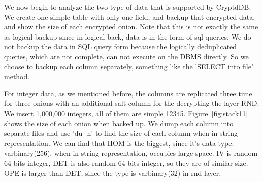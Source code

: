We now begin to analyze the two type of data that is supported by CryptdDB. We create one simple table with only one field, and backup that encrypted data, and show the size of each encrypted onion. Note that this is not exactly the same as logical backup since in logical back, data is in the form of sql queries. We do not backup the data in SQL query form because the logically deduplicated queries, which are not complete, can not execute on the DBMS directly. So we choose to backup each column separately, something like the 'SELECT into file' method.

For integer data, as we mentioned before, the columns are replicated three time for three onions with an additional salt column for the decrypting the layer RND. We insert 1,000,000 integers, all of them are simple 12345. Figure~\ref{fig:stack11} shows the size of each onion when backed up. We dump each column into separate files and use 'du -h' to find the size of each column when in string representation. We can find that HOM is the biggest, since it's data type: varbinary(256), when in string representation, occupies large space. IV is random 64 bits integer, DET is also random 64 bits integer, so they are of similar size. OPE is larger than DET, since the type is varbinary(32) in rnd layer. 





